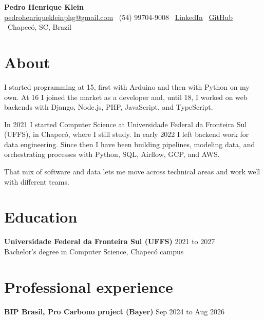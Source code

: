 \documentclass[a4paper,10pt]{article}
\begin{document}
\begin{center}
    {\LARGE \textbf{Pedro Henrique Klein}}\\
    \vspace{0.2cm}
    \href{mailto:pedrohenriquekleinphg@gmail.com}{pedrohenriquekleinphg@gmail.com} \textbar\
    (54) 99704-9008 \textbar\
    \href{https://www.linkedin.com/in/pedro-henrique-klein-a41122221/}{LinkedIn} \textbar\
    \href{https://github.com/Pedrinhonitz}{GitHub} \textbar\
    Chapecó, SC, Brazil
\end{center}

\vspace{0.3cm}

\section*{About}

I started programming at 15, first with Arduino and then with Python on my own. At 16 I joined the market as a developer and, until 18, I worked on web backends with Django, Node.js, PHP, JavaScript, and TypeScript.

In 2021 I started Computer Science at Universidade Federal da Fronteira Sul (UFFS), in Chapecó, where I still study. In early 2022 I left backend work for data engineering. Since then I have been building pipelines, modeling data, and orchestrating processes with Python, SQL, Airflow, GCP, and AWS.

That mix of software and data lets me move across technical areas and work well with different teams.

\section*{Education}

\textbf{Universidade Federal da Fronteira Sul (UFFS)} \hfill 2021 to 2027 \\
Bachelor's degree in Computer Science, Chapecó campus

\section*{Professional experience}

\textbf{BIP Brasil, Pro Carbono project (Bayer)} \hfill Sep 2024 to Aug 2026
\end{document}
